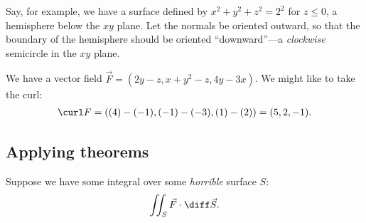 \documentclass{multi}
\begin{document}
Say, for example, we have a surface defined by \(x^2 + y^2 + z^2 = 2^2\) for \(z
\le 0\), a hemisphere below the \(xy\) plane.  Let the normals be oriented
outward, so that the boundary of the hemisphere should be oriented
``downward''---a \emph{clockwise} semicircle in the \(xy\) plane.

We have a vector field \(\vec F = (2y-z, x+y^2-z, 4y-3x)\).  We might like to
take the curl:
\begin{gather*}
  \curl F = ((4) - (-1), (-1) - (-3), (1) - (2)) = (5, 2, -1).
\end{gather*}


\subsection*{Applying theorems}

Suppose we have some integral over some \emph{horrible} surface \(S\):
\begin{gather*}
  \iint_S \vec F \cdot \diff \vec S.
\end{gather*}
\end{document}
